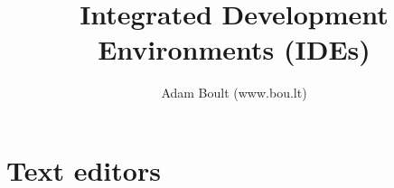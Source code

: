 \documentclass[oneside]{book}
\begin{document}
\author{Adam Boult (www.bou.lt)}
\title{Integrated Development Environments (IDEs)}
\maketitle

\setcounter{tocdepth}{0}
\tableofcontents



\part{Text editors}


\end{document}
